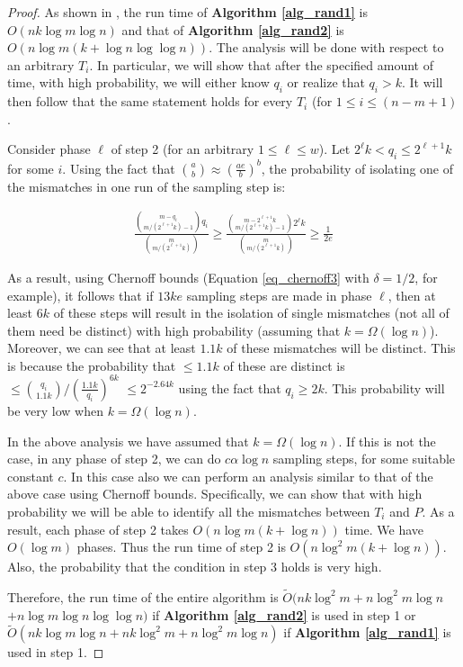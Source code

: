 \noindent\begin{proof}
As shown in \cite{CEP+07}, the run time of {\bf Algorithm \ref{alg_rand1}} is
$O(nk\log m\log n)$ and that of {\bf Algorithm \ref{alg_rand2}} is $O(n\log
m(k+\log n\log\log n))$. The analysis will be done with respect to an arbitrary $T_i$. In particular, we
will show that after the specified amount of time, with high probability, we
will either know $q_i$ or realize that $q_i>k$. It will then follow that the
same statement holds for every $T_i$ (for $1\leq i\leq (n-m+1)$.

Consider phase $\ell$ of step 2 (for an arbitrary $1\leq \ell\leq w$). Let
$2^\ell k<q_i\leq 2^{\ell+1}k$ for some $i$. Using the fact that
${\binom{a}{b}}\approx\left(\frac{ae}{b}\right )^b$, the probability of
isolating one of the mismatches in one run of the sampling step is:

\begin{align*}
\frac{{ \binom{m-q_i}{m/(2^{\ell+1} k)-1}  
}q_i}{{ \binom{m}{m/(2^{\ell+1} k)} }} 
\geq\frac{{ \binom{m-2^{\ell+1}k}{m/(2^{\ell+1} k)-1} }2^\ell
k}{{ \binom{m}{m/(2^{\ell+1} k)} }}\geq\frac{1}{2e}
\end{align*}

 As a result, using
Chernoff bounds (Equation \ref{eq_chernoff3} with $\delta=1/2$, for
example), it follows that if $13ke$ sampling steps are made in phase $\ell$, then at least $6k$ of these steps will result in the isolation of
single mismatches (not all of them need be distinct) with high probability
(assuming that $k=\Omega(\log n)$). Moreover, we can see that at least $1.1k$
of these mismatches will be distinct. This is because the probability that
$\leq 1.1k$ of these are distinct is $\leq {{ \binom{q_i}{1.1k} }}/{\left
(\frac{1.1k}{q_i}\right )^{6k}}$ $\leq 2^{-2.64k}$ using the fact that $q_i\geq
2k$. This probability will be very low when $k=\Omega(\log n)$.

In the above analysis we have assumed that $k=\Omega(\log n)$. If this is not
the case, in any phase of step 2, we can do $c\alpha\log n$ sampling steps, for
some suitable constant $c$. In this case also we can perform an analysis
similar to that of the above case using Chernoff bounds. Specifically, we can show that with high probability we will be able to identify all the mismatches between $T_i$ and $P$. As a result, each phase of step 2 takes $O(n\log m(k+\log n))$ time. We have $O(\log m)$ phases. Thus the run time of
step 2 is $O(n\log^2m(k+\log n))$. Also, the probability that the condition in
step 3 holds is very high.

Therefore, the run time of the entire algorithm is 
$\widetilde O(nk\log^2m+n\log^2m\log n$ $+ n \log m\log n\log\log n)$ if {\bf
Algorithm \ref{alg_rand2}} is used in step 1 or $\widetilde O(nk\log m\log
n+nk\log^2m+n\log^2m\log n)$ if {\bf Algorithm \ref{alg_rand1}} is used in step 1.
\end{proof}


